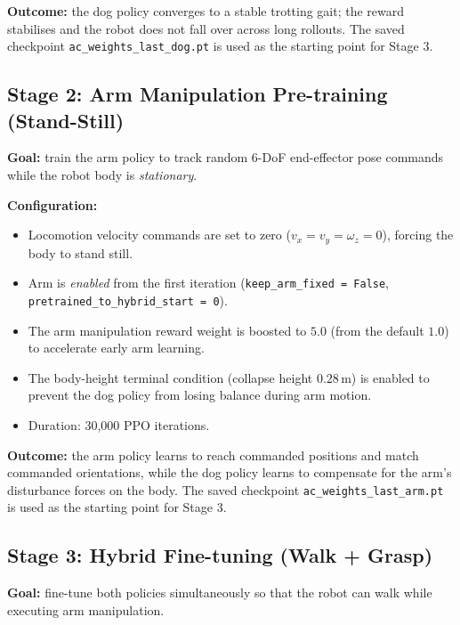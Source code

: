 \textbf{Outcome:} the dog policy converges to a stable trotting gait;
the reward stabilises and the robot does not fall over across long rollouts.
The saved checkpoint \texttt{ac\_weights\_last\_dog.pt} is used as the
starting point for Stage 3.

\subsection{Stage 2: Arm Manipulation Pre-training (Stand-Still)}

\textbf{Goal:} train the arm policy to track random 6-DoF end-effector
pose commands while the robot body is \emph{stationary}.

\textbf{Configuration:}
\begin{itemize}
  \item Locomotion velocity commands are set to zero
        ($v_x = v_y = \omega_z = 0$), forcing the body to stand still.
  \item Arm is \emph{enabled} from the first iteration
        (\texttt{keep\_arm\_fixed = False},
        \texttt{pretrained\_to\_hybrid\_start = 0}).
  \item The arm manipulation reward weight is boosted to $5.0$
        (from the default $1.0$) to accelerate early arm learning.
  \item The body-height terminal condition (collapse height $0.28$\,m)
        is enabled to prevent the dog policy from losing balance during
        arm motion.
  \item Duration: 30,000 PPO iterations.
\end{itemize}

\textbf{Outcome:} the arm policy learns to reach commanded positions and
match commanded orientations, while the dog policy learns to compensate
for the arm's disturbance forces on the body.
The saved checkpoint \texttt{ac\_weights\_last\_arm.pt} is used as the
starting point for Stage 3.

\subsection{Stage 3: Hybrid Fine-tuning (Walk + Grasp)}

\textbf{Goal:} fine-tune both policies simultaneously so that the robot
can walk while executing arm manipulation.

